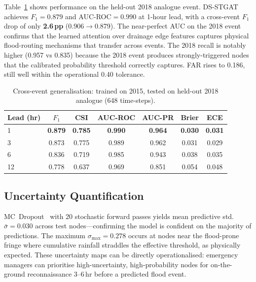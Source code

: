 \documentclass[10pt,twocolumn]{article}
\begin{document}
Table~\ref{tab:cross_event} shows performance on the held-out 2018
analogue event.
DS-STGAT achieves $F_1{=}0.879$ and AUC-ROC${=}0.990$ at 1-hour lead,
with a cross-event $F_1$ drop of only \textbf{2.6\,pp} (0.906$\to$0.879).
The near-perfect AUC on the 2018 event confirms that the learned attention
over drainage edge features captures physical flood-routing mechanisms that
transfer across events.
The 2018 recall is notably higher (0.957 vs 0.835) because the 2018 event
produces strongly-triggered nodes that the calibrated probability threshold
correctly captures.
FAR rises to 0.186, still well within the operational 0.40 tolerance.

\begin{table}[t]
\small
\caption{Cross-event generalisation: trained on 2015, tested on
         held-out 2018 analogue (648 time-steps).}
\label{tab:cross_event}
\centering
\setlength{\tabcolsep}{5pt}
\begin{tabular}{@{}lcccccc@{}}
\toprule
Lead (hr) & $F_1$ & CSI & AUC-ROC & AUC-PR & Brier & ECE \\
\midrule
1  & \textbf{0.879} & \textbf{0.785} & \textbf{0.990} & \textbf{0.964} & \textbf{0.030} & \textbf{0.031} \\
3  & 0.873 & 0.775 & 0.989 & 0.962 & 0.031 & 0.029 \\
6  & 0.836 & 0.719 & 0.985 & 0.943 & 0.038 & 0.035 \\
12 & 0.778 & 0.637 & 0.969 & 0.851 & 0.054 & 0.048 \\
\bottomrule
\end{tabular}
\end{table}

\subsection{Uncertainty Quantification}

MC~Dropout~\cite{gal2016} with 20 stochastic forward passes yields mean
predictive std.\ $\bar{\sigma}{=}0.030$ across test nodes---confirming
the model is confident on the majority of predictions.
The maximum $\sigma_{\max}{=}0.278$ occurs at nodes near the flood-prone
fringe where cumulative rainfall straddles the effective threshold, as
physically expected.
These uncertainty maps can be directly operationalised: emergency managers
can prioritise high-uncertainty, high-probability nodes for on-the-ground
reconnaissance 3--6\,hr before a predicted flood event.

\end{document}
